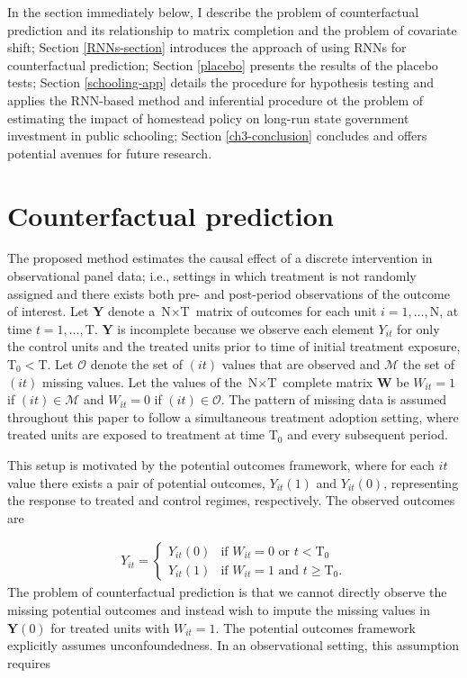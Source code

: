 In the section immediately below, I describe the problem of counterfactual prediction and its relationship to matrix completion and the problem of covariate shift; Section \ref{RNNs-section} introduces the approach of using RNNs for counterfactual prediction; Section \ref{placebo} presents the results of the placebo tests; Section \ref{schooling-app} details the procedure for hypothesis testing and applies the RNN-based method and inferential procedure ot the problem of estimating the impact of homestead policy on long-run state government investment in public schooling; Section \ref{ch3-conclusion} concludes and offers potential avenues for future research. 

\section{Counterfactual prediction} \label{prediction}

The proposed method estimates the causal effect of a discrete intervention in observational panel data; i.e., settings in which treatment is not randomly assigned and there exists both pre- and post-period observations of the outcome of interest. Let $\boldsymbol{Y}$ denote a $\text{N} \times \text{T}$ matrix of outcomes for each unit $i =1, \ldots, \text{N}$, at time $t = 1, \ldots, \text{T}$. $\boldsymbol{Y}$ is incomplete because we observe each element $Y_{it}$ for only the control units and the treated units prior to time of initial treatment exposure, $\text{T}_0 < \text{T}$. Let $\mathcal{O}$ denote the set of $(it)$ values that are observed and $\mathcal{M}$ the set of $(it)$ missing values. Let the values of the $\text{N} \times \text{T}$ complete matrix $\boldsymbol{W}$ be $W_{it} =1$ if $(it) \in \mathcal{M}$ and $W_{it} = 0$ if $(it) \in \mathcal{O}$. The pattern of missing data is assumed throughout this paper to follow a simultaneous treatment adoption setting, where treated units are exposed to treatment at time $\text{T}_0$ and every subsequent period. 

This setup is motivated by the \citet{neyman1923} potential outcomes framework, where for each $it$ value there exists a pair of potential outcomes, $Y_{it}(1)$ and $Y_{it}(0)$, representing the response to treated and control regimes, respectively. The observed outcomes are 

\begin{align*} 
	Y_{it} = \begin{cases}
		Y_{it}(0) 	& \mbox{if } W_{it} = 0  \text{ or } t < \text{T}_0 \\
		Y_{it}(1) 	& \mbox{if } W_{it} = 1  \text{ and } t \geq \text{T}_0.
	\end{cases} 
\end{align*} 
\noindent
The problem of counterfactual prediction is that we cannot directly observe the missing potential outcomes and instead wish to impute the missing values in $\boldsymbol{Y}(0)$ for treated units with $W_{it} =1$.  The potential outcomes framework explicitly assumes unconfoundedness. In an observational setting, this assumption requires

